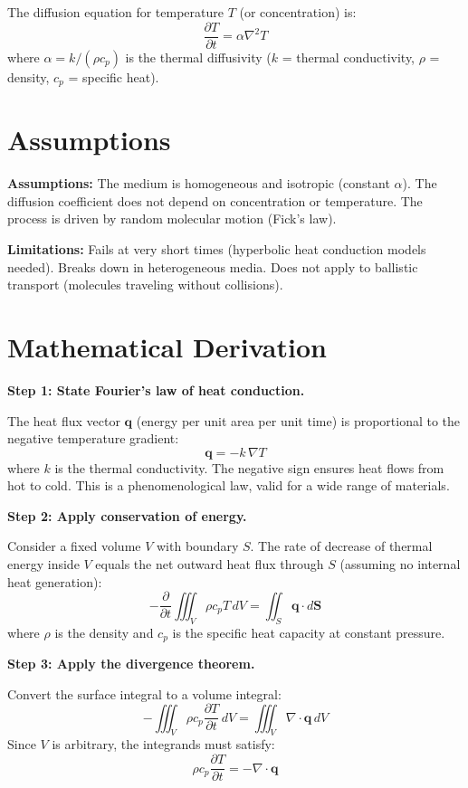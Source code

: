 \documentclass[11pt,openright]{book}
\begin{document}
The diffusion equation for temperature $T$ (or concentration) is:
\[
\frac{\partial T}{\partial t} = \alpha \nabla^2 T
\]
where $\alpha = k/(\rho c_p)$ is the thermal diffusivity ($k$ = thermal conductivity, $\rho$ = density, $c_p$ = specific heat).
\section*{Assumptions}

\textbf{Assumptions:} The medium is homogeneous and isotropic (constant $\alpha$). The diffusion coefficient does not depend on concentration or temperature. The process is driven by random molecular motion (Fick's law).


\textbf{Limitations:} Fails at very short times (hyperbolic heat conduction models needed). Breaks down in heterogeneous media. Does not apply to ballistic transport (molecules traveling without collisions).


\section*{Mathematical Derivation}

\textbf{Step 1: State Fourier's law of heat conduction.}

The heat flux vector $\mathbf{q}$ (energy per unit area per unit time) is proportional to the negative temperature gradient:
\begin{equation}
\mathbf{q} = -k\,\nabla T
\end{equation}
where $k$ is the thermal conductivity. The negative sign ensures heat flows from hot to cold. This is a phenomenological law, valid for a wide range of materials.

\textbf{Step 2: Apply conservation of energy.}

Consider a fixed volume $V$ with boundary $S$. The rate of decrease of thermal energy inside $V$ equals the net outward heat flux through $S$ (assuming no internal heat generation):
\begin{equation}
-\frac{\partial}{\partial t}\iiint_V \rho c_p T\, dV = \iint_S \mathbf{q} \cdot d\mathbf{S}
\end{equation}
where $\rho$ is the density and $c_p$ is the specific heat capacity at constant pressure.

\textbf{Step 3: Apply the divergence theorem.}

Convert the surface integral to a volume integral:
\begin{equation}
-\iiint_V \rho c_p \frac{\partial T}{\partial t}\, dV = \iiint_V \nabla \cdot \mathbf{q}\, dV
\end{equation}
Since $V$ is arbitrary, the integrands must satisfy:
\begin{equation}
\rho c_p \frac{\partial T}{\partial t} = -\nabla \cdot \mathbf{q}
\end{equation}
\end{document}
